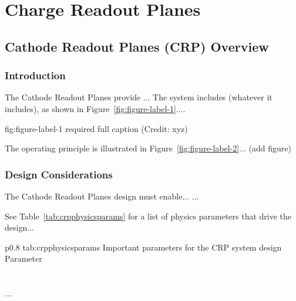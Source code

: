 \chapter{Charge Readout Planes}
\label{ch:fddp-CRP}

\section{Cathode Readout Planes (CRP) Overview}
\label{sec:fddp-crp-ov}


\subsection{Introduction}
\label{sec:fddp-crp-intro}

The Cathode Readout Planes provide ...
The system includes (whatever it includes), as shown in Figure~\ref{fig:figure-label-1}.... 


\begin{dunefigure}{fig:figure-label-1}
{required full caption (Credit: xyz)}
\end{dunefigure}

The operating principle is illustrated in Figure~\ref{fig:figure-label-2}... (add figure)


\subsection{Design Considerations}
\label{sec:fddp-crp-des-consid}


The Cathode Readout Planes design must enable... 
...


See Table~\ref{tab:crpphysicsparams} for a list of physics parameters that drive the design...

\begin{dunetable}
{p{0.8\textwidth}}
{tab:crpphysicsparams}
{Important parameters for the CRP system design}   
Parameter \\ \toprowrule
  \\ \colhline
   \\ \colhline
 ...\\ 
\end{dunetable}


